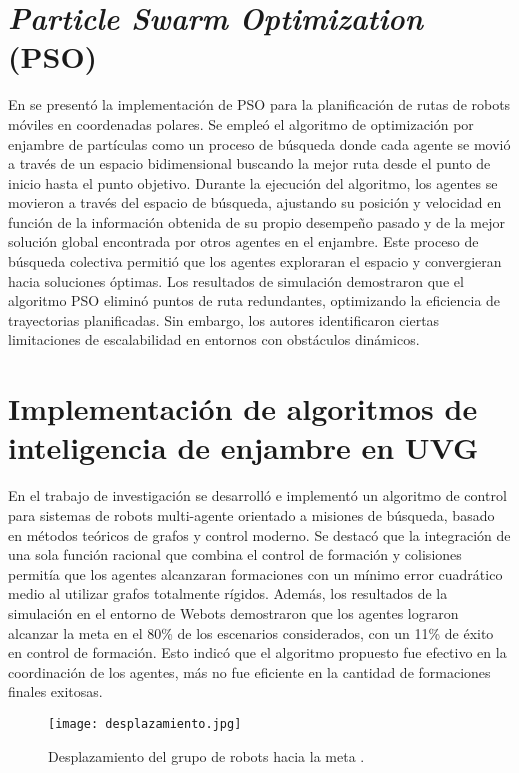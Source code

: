 \section{\textit{Particle Swarm Optimization} (PSO)}
En \cite{han_mobile_2019} se presentó la implementación de PSO para la planificación de rutas de robots móviles en coordenadas polares. Se empleó el algoritmo de optimización por enjambre de partículas como un proceso de búsqueda donde cada agente se movió a través de un espacio bidimensional buscando la mejor ruta desde el punto de inicio hasta el punto objetivo. Durante la ejecución del algoritmo, los agentes se movieron a través del espacio de búsqueda, ajustando su posición y velocidad en función de la información obtenida de su propio desempeño pasado y de la mejor solución global encontrada por otros agentes en el enjambre. Este proceso de búsqueda colectiva permitió que los agentes exploraran el espacio y convergieran hacia soluciones óptimas. Los resultados de simulación demostraron que el algoritmo PSO eliminó puntos de ruta redundantes, optimizando la eficiencia de trayectorias planificadas. Sin embargo, los autores identificaron ciertas limitaciones de escalabilidad en entornos con obstáculos dinámicos. 

\section{Implementación de algoritmos de inteligencia de enjambre en UVG}
En el trabajo de investigación \cite{pena_echeverria_algoritmo_2019} se desarrolló e implementó un algoritmo de control para sistemas de robots multi-agente orientado a misiones de búsqueda, basado en métodos teóricos de grafos y control moderno. Se destacó que la integración de una sola función racional que combina el control de formación y colisiones permitía que los agentes alcanzaran formaciones con un mínimo error cuadrático medio al utilizar grafos totalmente rígidos. Además, los resultados de la simulación en el entorno de Webots demostraron que los agentes lograron alcanzar la meta en el 80\% de los escenarios considerados, con un 11\% de éxito en control de formación. Esto indicó que el algoritmo propuesto fue efectivo en la coordinación de los agentes, más no fue eficiente en la cantidad de formaciones finales exitosas.

\begin{figure}[H]
	\centering
	\texttt{[image: desplazamiento.jpg]}
	\caption{Desplazamiento del grupo de robots hacia la meta  \cite{pena_echeverria_algoritmo_2019}.}
	\label{fig2_3}
\end{figure}

